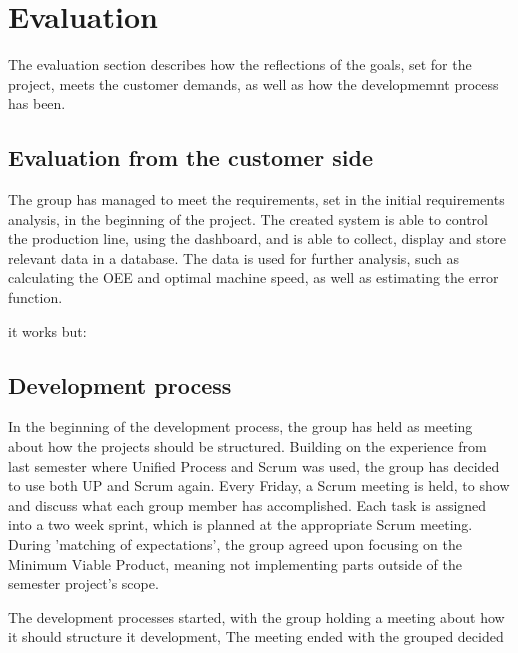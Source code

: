 \section{Evaluation}
The evaluation section describes how the reflections of the goals, set for the
project, meets the customer demands, as well as how the developmemnt process has
been.


\subsection{Evaluation from the customer side}
The group has managed to meet the requirements, set in the initial requirements
analysis, in the beginning of the project. The created system is able to control
the production line, using the dashboard, and is able to collect, display and
store relevant data in a database. The data is used for further analysis, such
as calculating the OEE and optimal machine speed, as well as estimating the
error function.

it works but:


\subsection{Development process}
In the beginning of the development process, the group has held as meeting
about how the projects should be structured. Building on the experience from
last semester where Unified Process and Scrum was used, the group has
decided to use both UP and Scrum again. Every Friday, a Scrum meeting is held,
to show and discuss what each group member has accomplished. Each task is
assigned into a two week sprint, which is planned at the appropriate Scrum
meeting.
During 'matching of expectations', the group agreed upon focusing on the Minimum
Viable Product, meaning not implementing parts outside of the semester project's
scope.



The development processes started, with the group holding a meeting about
how it should structure it development, The meeting ended with the grouped decided













